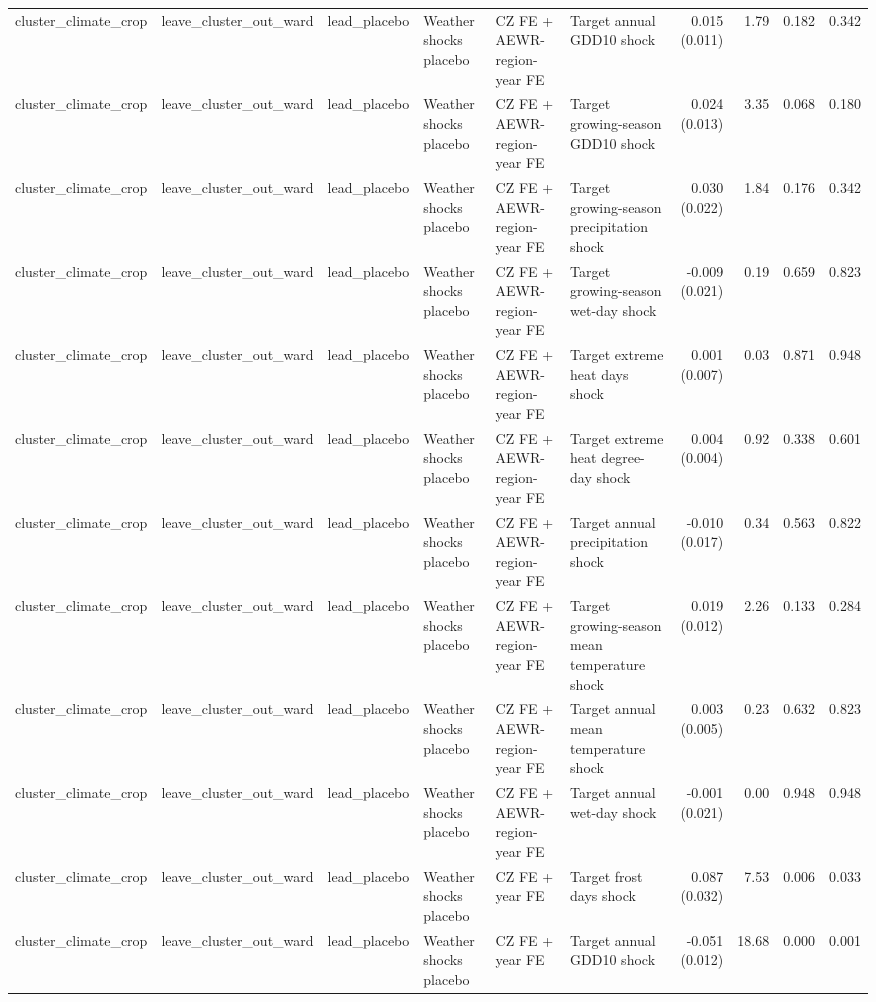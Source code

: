 \begin{tabular}{llllllrrrr}
cluster_climate_crop & leave_cluster_out_ward & lead_placebo & Weather shocks placebo & CZ FE + AEWR-region-year FE & Target annual GDD10 shock & 0.015 (0.011) & 1.79 & 0.182 & 0.342 \\
cluster_climate_crop & leave_cluster_out_ward & lead_placebo & Weather shocks placebo & CZ FE + AEWR-region-year FE & Target growing-season GDD10 shock & 0.024 (0.013) & 3.35 & 0.068 & 0.180 \\
cluster_climate_crop & leave_cluster_out_ward & lead_placebo & Weather shocks placebo & CZ FE + AEWR-region-year FE & Target growing-season precipitation shock & 0.030 (0.022) & 1.84 & 0.176 & 0.342 \\
cluster_climate_crop & leave_cluster_out_ward & lead_placebo & Weather shocks placebo & CZ FE + AEWR-region-year FE & Target growing-season wet-day shock & -0.009 (0.021) & 0.19 & 0.659 & 0.823 \\
cluster_climate_crop & leave_cluster_out_ward & lead_placebo & Weather shocks placebo & CZ FE + AEWR-region-year FE & Target extreme heat days shock & 0.001 (0.007) & 0.03 & 0.871 & 0.948 \\
cluster_climate_crop & leave_cluster_out_ward & lead_placebo & Weather shocks placebo & CZ FE + AEWR-region-year FE & Target extreme heat degree-day shock & 0.004 (0.004) & 0.92 & 0.338 & 0.601 \\
cluster_climate_crop & leave_cluster_out_ward & lead_placebo & Weather shocks placebo & CZ FE + AEWR-region-year FE & Target annual precipitation shock & -0.010 (0.017) & 0.34 & 0.563 & 0.822 \\
cluster_climate_crop & leave_cluster_out_ward & lead_placebo & Weather shocks placebo & CZ FE + AEWR-region-year FE & Target growing-season mean temperature shock & 0.019 (0.012) & 2.26 & 0.133 & 0.284 \\
cluster_climate_crop & leave_cluster_out_ward & lead_placebo & Weather shocks placebo & CZ FE + AEWR-region-year FE & Target annual mean temperature shock & 0.003 (0.005) & 0.23 & 0.632 & 0.823 \\
cluster_climate_crop & leave_cluster_out_ward & lead_placebo & Weather shocks placebo & CZ FE + AEWR-region-year FE & Target annual wet-day shock & -0.001 (0.021) & 0.00 & 0.948 & 0.948 \\
cluster_climate_crop & leave_cluster_out_ward & lead_placebo & Weather shocks placebo & CZ FE + year FE & Target frost days shock & 0.087 (0.032) & 7.53 & 0.006 & 0.033 \\
cluster_climate_crop & leave_cluster_out_ward & lead_placebo & Weather shocks placebo & CZ FE + year FE & Target annual GDD10 shock & -0.051 (0.012) & 18.68 & 0.000 & 0.001 \\

\end{tabular}
